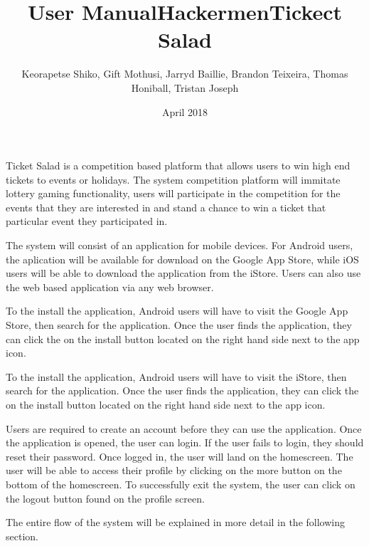 
\title{User Manual}
\title{Hackermen}
\title{Tickect Salad}

\author{Keorapetse Shiko, Gift Mothusi, Jarryd Baillie, Brandon Teixeira, Thomas Honiball, Tristan Joseph}
\date{April 2018}


    
Ticket Salad is a competition based platform that allows users to win high end tickets to events or holidays.
The system competition platform will immitate lottery gaming functionality, users will participate in the
 competition for the events that they are interested in and stand a chance to win a ticket that particular
 event they participated in.




The system will consist of an application for mobile devices. For Android users, the aplication will be available
for download on the Google App Store, while iOS users will be able to download the application from the iStore.
Users can also use the web based application via any web browser.

To the install the application, Android users will have to visit the Google App Store, then search for the application.
 Once the user finds the application, they can click the on the install button located on the right hand side next to the app icon.  


 To the install the application, Android users will have to visit the iStore, then search for the application.
 Once the user finds the application, they can click the on the install button located on the right hand side next to the app icon. 



 Users are required to create an account before they can use the application.
Once the application is opened, the user can login. If the user fails to login,
they should reset their password. Once logged in, the user will land on the homescreen.
The user will be able to access their profile by clicking on the more button on the 
bottom of the homescreen. To successfully exit the system, the user can click on the 
logout button found on the profile screen.



The entire flow of the system will be explained in more detail in the following section.
 




